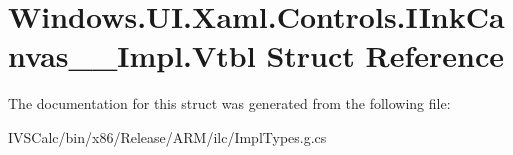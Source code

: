 \hypertarget{struct_windows_1_1_u_i_1_1_xaml_1_1_controls_1_1_i_ink_canvas_____impl_1_1_vtbl}{}\section{Windows.\+U\+I.\+Xaml.\+Controls.\+I\+Ink\+Canvas\+\_\+\+\_\+\+Impl.\+Vtbl Struct Reference}
\label{struct_windows_1_1_u_i_1_1_xaml_1_1_controls_1_1_i_ink_canvas_____impl_1_1_vtbl}


The documentation for this struct was generated from the following file\+:\begin{DoxyCompactItemize}
\item 
I\+V\+S\+Calc/bin/x86/\+Release/\+A\+R\+M/ilc/Impl\+Types.\+g.\+cs\end{DoxyCompactItemize}
